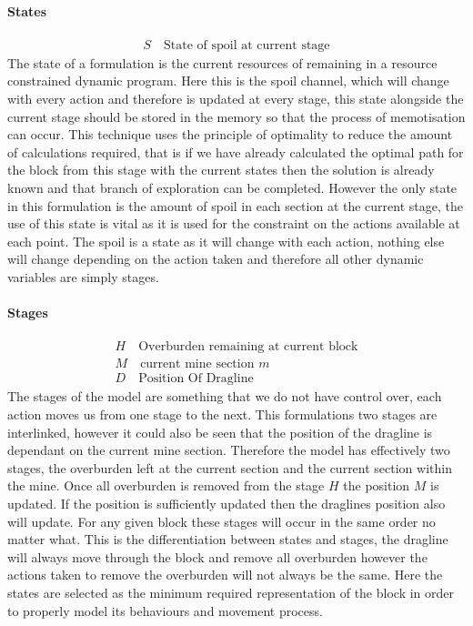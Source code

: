 \paragraph*{States}
\begin{align}
\label{Stte}
S \quad \text{State of spoil at current stage}
\end{align}
The state of a formulation is the current resources of remaining in a resource constrained dynamic program. Here this is the spoil channel, which will change with every action and therefore is updated at every stage, this state alongside the current stage should be stored in the memory so that the process of memotisation can occur. This technique uses the principle of optimality to reduce the amount of calculations required, that is if we have already calculated the optimal path for the block from this stage with the current states then the solution is already known and that branch of exploration can be completed. However the only state in this formulation is the amount of spoil in each section at the current stage, the use of this state is vital as it is used for the constraint on the actions available at each point. The spoil is a state as it will change with each action, nothing else will change depending on the action taken and therefore all other dynamic variables are simply stages. 
\paragraph*{Stages}
\begin{align}
\label{DP:Stage0}
H \quad \text{Overburden remaining at current block}\\
\label{DP:Stage1}
M \quad \text{current mine section }m \\ 
\label{DP:stage2}
D \quad \text{Position Of Dragline}
\end{align}
The stages of the model are something that we do not have control over, each action moves us from one stage to the next. This formulations two stages are interlinked, however it could also be seen that the position of the dragline is dependant on the current mine section. Therefore the model has effectively two stages, the overburden left at the current section and the current section within the mine. Once all overburden is removed from the stage $H$ the position $M$ is updated. If the position is sufficiently updated then the draglines position also will update. For any given block these stages will occur in the same order no matter what. This is the differentiation between states and stages, the dragline will always move through the block and remove all overburden however the actions taken to remove the overburden will not always be the same. Here the states are selected as the minimum required representation of the block in order to properly model its behaviours and movement process. 	
